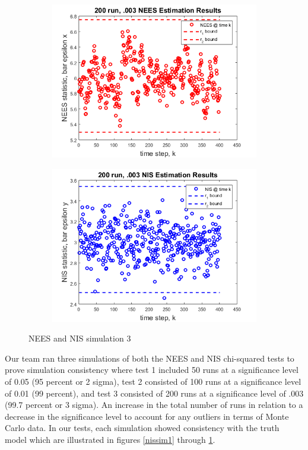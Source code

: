 \documentclass[12pt]{extarticle}
\begin{document}
{{\begin{figure}[h!]
    \begin{subfigure}[b]{0.49\textwidth}
        \centering
        \includegraphics[width=\textwidth]{Images/200NEES.png}
    \end{subfigure}
    \begin{subfigure}[b]{0.49\textwidth}
        \centering
        \includegraphics[width=\textwidth]{Images/200NIS.png}
    \end{subfigure}
    \caption{NEES and NIS simulation 3}
    \label{nissim3}
\end{figure}

Our team ran three simulations of both the NEES and NIS chi-squared tests to prove simulation consistency where test 1 included 50 runs at a significance level of 0.05 (95 percent or 2 sigma), test 2 consisted of 100 runs at a significance level of 0.01 (99 percent), and test 3 consisted of 200 runs at a significance level of .003 (99.7 percent or 3 sigma).  An increase in the total number of runs in relation to a decrease in the significance level to account for any outliers in terms of Monte Carlo data.  In our tests, each simulation showed consistency with the truth model which are illustrated in figures \ref{nissim1} through \ref{nissim3}.


}}
\end{document}
